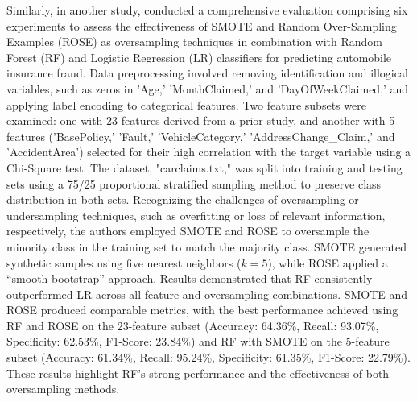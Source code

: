 \documentclass[twoside,11pt]{article}
\begin{document}
\begin{keywords}
Similarly, in another study, \cite{Salmi2022} conducted a comprehensive evaluation comprising six experiments to assess the effectiveness of SMOTE and Random Over-Sampling Examples (ROSE) as oversampling techniques in combination with Random Forest (RF) and Logistic Regression (LR) classifiers for predicting automobile insurance fraud. Data preprocessing involved removing identification and illogical variables, such as zeros in 'Age,' 'MonthClaimed,' and 'DayOfWeekClaimed,' and applying label encoding to categorical features. Two feature subsets were examined: one with 23 features derived from a prior study, and another with 5 features ('BasePolicy,' 'Fault,' 'VehicleCategory,' 'AddressChange\_Claim,' and 'AccidentArea') selected for their high correlation with the target variable using a Chi-Square test. The dataset, "carclaims.txt," was split into training and testing sets using a 75/25 proportional stratified sampling method to preserve class distribution in both sets. Recognizing the challenges of oversampling or undersampling techniques, such as overfitting or loss of relevant information, respectively, the authors employed SMOTE and ROSE to oversample the minority class in the training set to match the majority class. SMOTE generated synthetic samples using five nearest neighbors (\(k = 5\)), while ROSE applied a “smooth bootstrap” approach. Results demonstrated that RF consistently outperformed LR across all feature and oversampling combinations. SMOTE and ROSE produced comparable metrics, with the best performance achieved using RF and ROSE on the 23-feature subset (Accuracy: 64.36\%, Recall: 93.07\%, Specificity: 62.53\%, F1-Score: 23.84\%) and RF with SMOTE on the 5-feature subset (Accuracy: 61.34\%, Recall: 95.24\%, Specificity: 61.35\%, F1-Score: 22.79\%). These results highlight RF's strong performance and the effectiveness of both oversampling methods.



\end{keywords}
\end{document}
